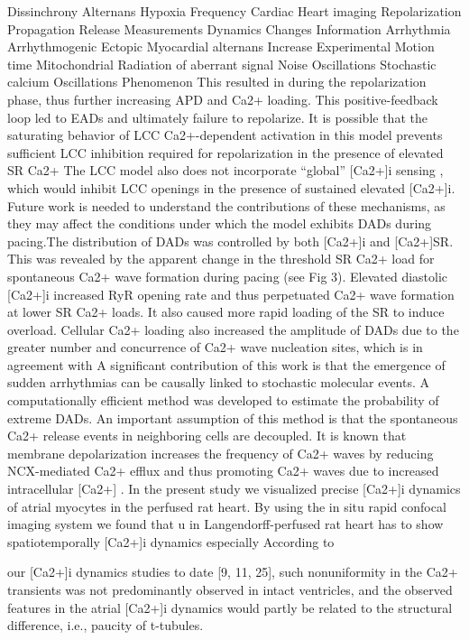 \documentclass[a4paper,12pt]{article}
\begin{document}
Dissinchrony
Alternans
Hypoxia
Frequency
Cardiac
Heart imaging
Repolarization
Propagation
Release
Measurements
Dynamics
Changes
Information
Arrhythmia
Arrhythmogenic
Ectopic
Myocardial alternans
Increase
Experimental
Motion time
Mitochondrial
Radiation of aberrant signal
Noise
Oscillations
Stochastic calcium Oscillations
Phenomenon
This resulted in
 during the repolarization phase,
thus further increasing APD and Ca2+ loading. This positive-feedback loop led to EADs and
ultimately failure to repolarize. It is possible that the saturating behavior of LCC Ca2+-dependent activation in this model prevents sufficient LCC inhibition required for repolarization in
the presence of elevated SR Ca2+
The LCC model also does not incorporate “global” [Ca2+]i
sensing , which would inhibit LCC openings in the presence of sustained elevated [Ca2+]i.
Future work is needed to understand the contributions of these mechanisms, as they may
affect the conditions under which the model exhibits DADs during pacing.The distribution of DADs was controlled by both [Ca2+]i and [Ca2+]SR. This was revealed
by the apparent change in the threshold SR Ca2+ load for spontaneous Ca2+ wave formation
during pacing (see Fig 3). Elevated diastolic [Ca2+]i increased RyR opening rate and thus perpetuated Ca2+ wave formation at lower SR Ca2+ loads. It also caused more rapid loading of the
SR to induce overload. Cellular Ca2+ loading also increased the amplitude of DADs due to the
greater number and concurrence of Ca2+ wave nucleation sites, which is in agreement with
A significant contribution of this work is that the emergence of sudden arrhythmias can be
causally linked to stochastic molecular events. A computationally efficient method was developed to estimate the probability of extreme DADs. An important assumption of this method is
that the spontaneous Ca2+ release events in neighboring cells are decoupled. It is known that
membrane depolarization increases the frequency of Ca2+ waves by reducing NCX-mediated
Ca2+ efflux and thus promoting Ca2+ waves due to increased intracellular [Ca2+] \cite{walker2017estimating}.
In the present study we visualized precise [Ca2+]i dynamics of atrial myocytes in the perfused rat heart.
By
using the in situ rapid confocal imaging system
we found that
u in
Langendorff-perfused rat heart has to show
spatiotemporally
[Ca2+]i dynamics
especially
According to

\iffalse
our [Ca2+]i dynamics studies to date [9, 11, 25], such nonuniformity
in the Ca2+ transients was not predominantly
observed in intact ventricles, and the observed features in
the atrial [Ca2+]i dynamics would partly be related to the
structural difference, i.e., paucity of t-tubules.
\end{document}
